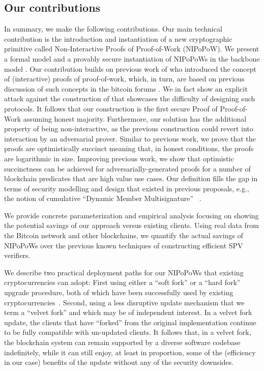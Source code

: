 \subsection{Our contributions}
In summary, we make the following contributions.
Our main technical contribution is the introduction and instantiation
of a new cryptographic
primitive called Non-Interactive Proofs of Proof-of-Work (NIPoPoW).
%
We present a formal model and a provably secure instantiation of NIPoPoWs in the
backbone model \cite{backbone}. Our contribution builds on previous work  of \cite{KLS} who introduced
the concept of (interactive) proofs of proof-of-work, which, in turn,
are based on previous discussion of such concepts in the bitcoin forums
\cite{highway}. We in fact show an explicit attack against the construction of \cite{KLS} that showcases the difficulty of designing such protocols. It follows
that our construction is the first secure Proof of Proof-of-Work assuming honest majority.
Furthermore, our solution has the additional property of being non-interactive,
as the previous construction could revert into interaction by an adversarial
prover. Similar to previous work, we prove that the proofs are
optimistically succinct meaning that, in honest conditions, the proofs are
logarithmic in size. Improving previous work, we show that optimistic
succinctness can be achieved for adversarially-generated proofs for a number
of blockchain predicates that are high value use cases. Our definition
fills the gap in terms of security modelling and design that existed in previous
proposals, e.g., the notion of cumulative ``Dynamic Member Multisignature''
~\cite{sidechains}.

We provide concrete parameterization and empirical analysis focusing on showing
the potential savings of our approach versus existing clients. Using real data
from the Bitcoin network and other blockchains, we quantify the actual savings of
NIPoPoWs over the previous known techniques of constructing efficient SPV
verifiers.

We describe two practical deployment paths for our NIPoPoWs that existing
cryptocurrencies can adopt: First using either a ``soft fork'' or a ``hard
fork'' upgrade procedure, both of which have been successfully used by existing
cryptocurrencies~\cite{sok}. Second, using a less disruptive update mechanism
that we term a ``velvet fork'' and which may be of independent interest. In a
velvet fork update, the clients that have ``forked'' from the original
implementation continue to be fully compatible with un-updated clients. It
follows that, in a velvet fork, the blockchain system can remain supported by a
diverse software codebase indefinitely, while it can still enjoy, at least in
proportion, some of the (efficiency in our case) benefits of the update without
any of the security downsides.
